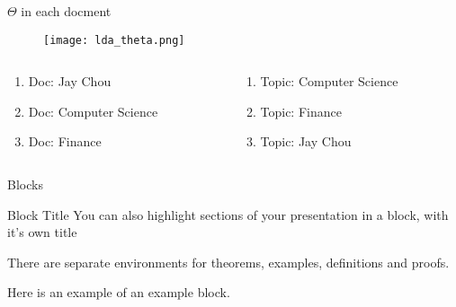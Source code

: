 \documentclass{beamer}
\begin{document}
\begin{frame}{$\Theta$ in each docment}
\begin{figure}[htbp]
	\centerline{\texttt{[image: lda\_theta.png]}}
\end{figure}

\begin{columns}[t] 

	\begin{column}[T]{5cm} 
          \begin{enumerate}
     		\item Doc: Jay Chou 
			\item Doc: Computer Science
			\item Doc: Finance
     	  \end{enumerate}
     \end{column}
     \pause
     \begin{column}[T]{5cm} %
     	\begin{enumerate}
     		\item Topic: Computer Science  
			\item Topic: Finance 
			\item Topic: Jay Chou 
     	\end{enumerate}
     \end{column}
     
     
\end{columns}

\end{frame}


\begin{frame}{Blocks}
	\begin{block}{Block Title}
		You can also highlight sections of your presentation in a block, with it's own title
	\end{block}

	\begin{theorem}
		There are separate environments for theorems, examples, definitions and proofs.
	\end{theorem}

	\begin{example}
		Here is an example of an example block.
	\end{example}
\end{frame}
\end{document}
